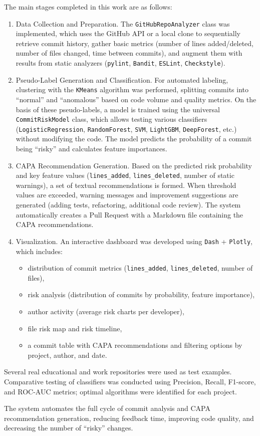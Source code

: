 {	The main stages completed in this work are as follows:
	\begin{enumerate}
		\item Data Collection and Preparation. The \texttt{GitHubRepoAnalyzer} class was implemented, which uses the GitHub API or a local clone to sequentially retrieve commit history, gather basic metrics (number of lines added/deleted, number of files changed, time between commits), and augment them with results from static analyzers (\texttt{pylint}, \texttt{Bandit}, \texttt{ESLint}, \texttt{Checkstyle}).
		\item Pseudo-Label Generation and Classification. For automated labeling, clustering with the \texttt{KMeans} algorithm was performed, splitting commits into “normal” and “anomalous” based on code volume and quality metrics. On the basis of these pseudo-labels, a model is trained using the universal \texttt{CommitRiskModel} class, which allows testing various classifiers (\texttt{LogisticRegression}, \texttt{RandomForest}, \texttt{SVM}, \texttt{LightGBM}, \texttt{DeepForest}, etc.) without modifying the code. The model predicts the probability of a commit being “risky” and calculates feature importances.
		\item CAPA Recommendation Generation. Based on the predicted risk probability and key feature values (\texttt{lines\_added}, \texttt{lines\_deleted}, number of static warnings), a set of textual recommendations is formed. When threshold values are exceeded, warning messages and improvement suggestions are generated (adding tests, refactoring, additional code review). The system automatically creates a Pull Request with a Markdown file containing the CAPA recommendations.
		\item Visualization. An interactive dashboard was developed using \texttt{Dash} + \texttt{Plotly}, which includes:
		\begin{itemize}
			\item distribution of commit metrics (\texttt{lines\_added}, \texttt{lines\_deleted}, number of files),
			\item risk analysis (distribution of commits by probability, feature importance),
			\item author activity (average risk charts per developer),
			\item file risk map and risk timeline,
			\item a commit table with CAPA recommendations and filtering options by project, author, and date.
		\end{itemize}
	\end{enumerate}
	
	Several real educational and work repositories were used as test examples. Comparative testing of classifiers was conducted using Precision, Recall, F1-score, and ROC-AUC metrics; optimal algorithms were identified for each project.
	
	The system automates the full cycle of commit analysis and CAPA recommendation generation, reducing feedback time, improving code quality, and decreasing the number of “risky” changes.
} %


